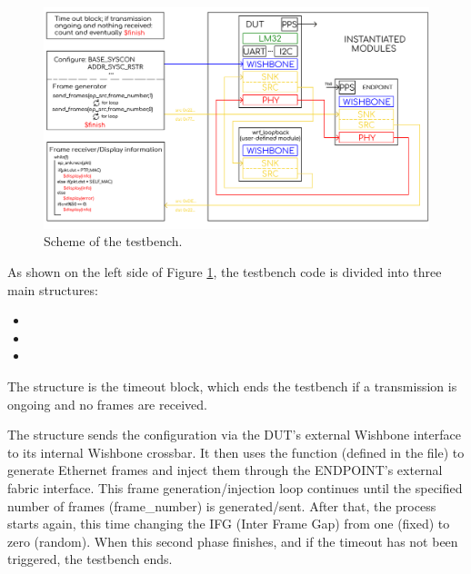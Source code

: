 \begin{figure}[H]
\centering
\includegraphics[width=14cm]{figures/tb_scheme.png}
\caption{Scheme of the testbench.}
\label{fig:tb-scheme}
\end{figure}

\noindent As shown on the left side of Figure \ref{fig:tb-scheme}, the testbench code is divided into three main structures:

\begin{itemize}
\item {}
\item {}
\item {}
\end{itemize}

\noindent The  structure is the timeout block, which ends the testbench if a transmission is ongoing and no frames are received.

\vspace{5mm}

\noindent The  structure sends the configuration via the DUT’s external Wishbone interface to its internal Wishbone crossbar.
It then uses the function  (defined in the  file) to generate Ethernet frames and inject them through the ENDPOINT’s external fabric interface.
This frame generation/injection loop continues until the specified number of frames (frame\_number) is generated/sent.
After that, the process starts again, this time changing the IFG (Inter Frame Gap) from one (fixed) to zero (random).
When this second phase finishes, and if the timeout has not been triggered, the testbench ends.

\vspace{5mm}

